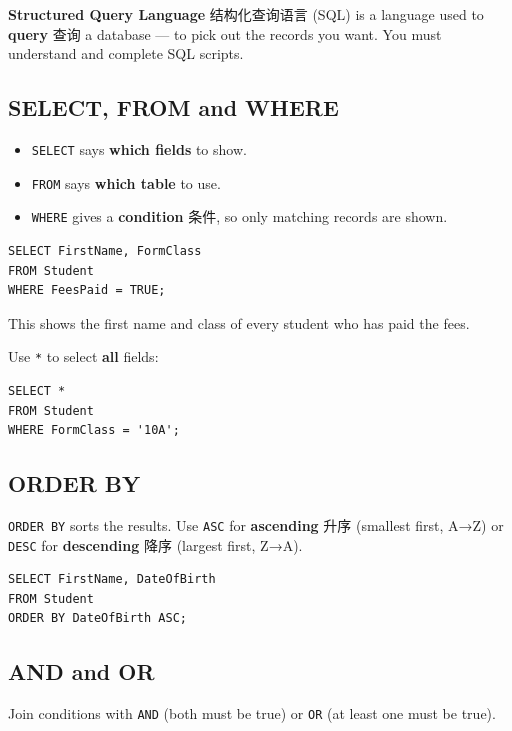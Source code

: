 \documentclass[11pt]{article}
\begin{document}
\textbf{Structured Query Language} 结构化查询语言 (SQL) is a language used to \textbf{query} 查询 a database — to pick out the records you want. You must understand and complete SQL scripts.

\subsection*{SELECT, FROM and WHERE}

\begin{itemize}
\item \texttt{SELECT} says \textbf{which fields} to show.

\item \texttt{FROM} says \textbf{which table} to use.

\item \texttt{WHERE} gives a \textbf{condition} 条件, so only matching records are shown.

\end{itemize}

\begin{Verbatim}
SELECT FirstName, FormClass
FROM Student
WHERE FeesPaid = TRUE;
\end{Verbatim}

This shows the first name and class of every student who has paid the fees.

Use \texttt{*} to select \textbf{all} fields:

\begin{Verbatim}
SELECT *
FROM Student
WHERE FormClass = '10A';
\end{Verbatim}

\subsection*{ORDER BY}

\texttt{ORDER BY} sorts the results. Use \texttt{ASC} for \textbf{ascending} 升序 (smallest first, A→Z) or \texttt{DESC} for \textbf{descending} 降序 (largest first, Z→A).

\begin{Verbatim}
SELECT FirstName, DateOfBirth
FROM Student
ORDER BY DateOfBirth ASC;
\end{Verbatim}

\subsection*{AND and OR}

Join conditions with \texttt{AND} (both must be true) or \texttt{OR} (at least one must be true).
\end{document}
